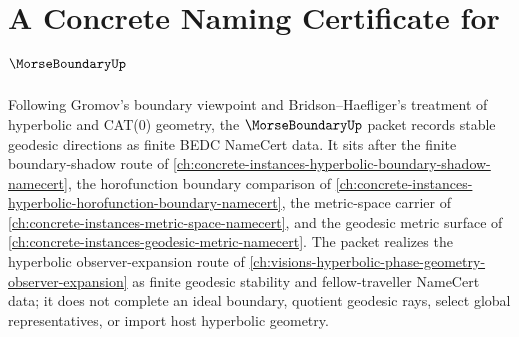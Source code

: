 \chapter{A Concrete Naming Certificate for $\MorseBoundaryUp$}
\label{ch:concrete-instances-morse-boundary-namecert}

Following Gromov's boundary viewpoint and Bridson--Haefliger's treatment of hyperbolic and CAT(0) geometry, the $\MorseBoundaryUp$ packet records stable geodesic directions as finite BEDC NameCert data. It sits after the finite boundary-shadow route of \autoref{ch:concrete-instances-hyperbolic-boundary-shadow-namecert}, the horofunction boundary comparison of \autoref{ch:concrete-instances-hyperbolic-horofunction-boundary-namecert}, the metric-space carrier of \autoref{ch:concrete-instances-metric-space-namecert}, and the geodesic metric surface of \autoref{ch:concrete-instances-geodesic-metric-namecert}. The packet realizes the hyperbolic observer-expansion route of \autoref{ch:visions-hyperbolic-phase-geometry-observer-expansion} as finite geodesic stability and fellow-traveller NameCert data; it does not complete an ideal boundary, quotient geodesic rays, select global representatives, or import host hyperbolic geometry.

